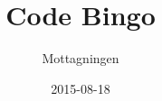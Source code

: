 \documentclass[a4paper]{scrreprt}
\title{Code Bingo}
\subtitle{}
\author{Mottagningen}
\date{2015-08-18}
\begin{document}
\maketitle

\chapter{}

\chapter{}

\chapter{}

\chapter{}

\chapter{}

\chapter{}

\chapter{}

\chapter{}

\chapter{}

\chapter{}

\chapter{}

\chapter{}

\end{document}
